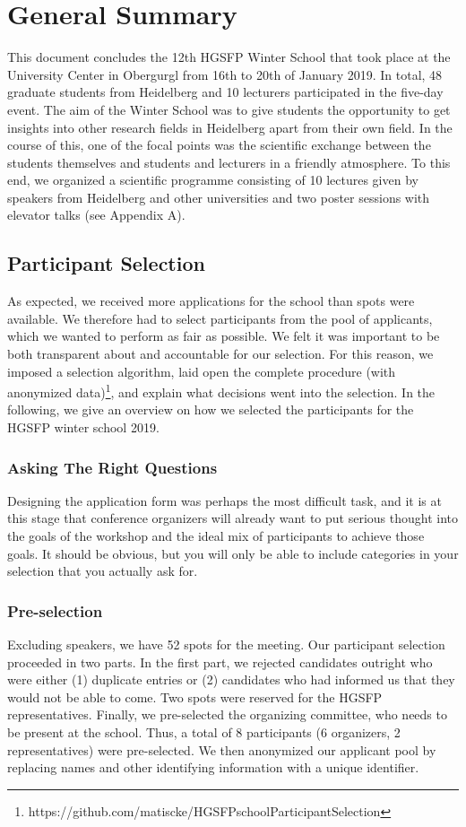 \section*{General Summary}
This document concludes the 12th HGSFP Winter School that took place at
the University Center in Obergurgl from 16th to 20th of January 2019. In
total, 48 graduate students from Heidelberg and 10 lecturers participated
in the five-day event. The aim of the Winter School was to give students
the opportunity to get insights into other research fields in
Heidelberg apart from their own field. In the course of this, one of the
focal points was the scientific exchange between the students
themselves and students and lecturers in a friendly atmosphere. To this
end, we organized a scientific programme consisting of 10 lectures given
by speakers from Heidelberg and other universities and two poster
sessions with elevator talks (see Appendix A).


\subsection*{Participant Selection}
As expected, we received more applications for the school than spots were available. We therefore had to select participants from the pool of applicants, which we wanted to perform as fair as possible. We felt it was important to be both transparent about and accountable for our selection. For this reason, we imposed a selection algorithm, laid open the complete procedure (with anonymized data)\footnote{https://github.com/matiscke/HGSFPschoolParticipantSelection}, and explain what decisions went into the selection. In the following, we give an overview on how we selected the participants for the HGSFP winter school 2019.

\subsubsection*{Asking The Right Questions}
Designing the application form was perhaps the most difficult task, and it is at this stage that conference organizers will already want to put serious thought into the goals of the workshop and the ideal mix of participants to achieve those goals. It should be obvious, but you will only be able to include categories in your selection that you actually ask for.

\subsubsection*{Pre-selection}
Excluding speakers, we have 52 spots for the meeting. Our participant selection proceeded in two parts. In the first part, we rejected candidates outright who were either (1) duplicate entries or (2) candidates who had informed us that they would not be able to come. Two spots were reserved for the HGSFP representatives. Finally, we pre-selected the organizing committee, who needs to be present at the school. Thus, a total of 8 participants (6 organizers, 2 representatives) were pre-selected. We then anonymized our applicant pool by replacing names and other identifying information with a unique identifier. 

